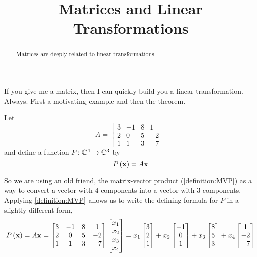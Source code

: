 \documentclass{ximera}
\title{Matrices and Linear Transformations}
\begin{document}
\begin{abstract}
Matrices are deeply related to linear transformations.
\end{abstract}
\maketitle

If you give me a matrix, then I can quickly build you a linear transformation.  Always.  First a motivating example and then the theorem.

\begin{example}

Let
\[
A=
\begin{bmatrix}
3&-1&8&1\\
2&0&5&-2\\
1&1&3&-7
\end{bmatrix}
\]
and define a function $P\colon \mathbb{C}^{4}\rightarrow\mathbb{C}^{3}$ by
\[
P\left(\mathbf{x}\right)=A\mathbf{x}
\]


So we are using an old friend, the matrix-vector product (\ref{definition:MVP}) as a way to convert a vector with 4 components into a vector with 3 components.  Applying \ref{definition:MVP} allows us to write the defining formula for $P$ in a slightly different form,
\[
P\left(\mathbf{x}\right)=A\mathbf{x}=
\begin{bmatrix}
3&-1&8&1\\
2&0&5&-2\\
1&1&3&-7
\end{bmatrix}
\begin{bmatrix}x_1\\x_2\\x_3\\x_4\end{bmatrix}
=
x_1\begin{bmatrix}3\\2\\1\end{bmatrix}+
x_2\begin{bmatrix}-1\\0\\1\end{bmatrix}+
x_3\begin{bmatrix}8\\5\\3\end{bmatrix}+
x_4\begin{bmatrix}1\\-2\\-7\end{bmatrix}
\]





\end{example}
\end{document}
